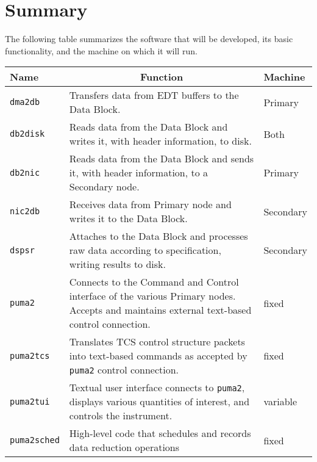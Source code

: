 \chapter{Summary}

The following table summarizes the software that will be developed,
its basic functionality, and the machine on which it will run.

\vspace{5mm}

\begin{tabular}{l|p{8cm}|l}

Name & \multicolumn{1}{c}{Function} & Machine \\ \hline

{\tt dma2db} & Transfers data from EDT buffers to the Data Block.
	& Primary \\

{\tt db2disk} & Reads data from the Data Block and writes it, with
	header information, to disk. & Both \\

{\tt db2nic} & Reads data from the Data Block and sends it, with
	header information, to a Secondary node. & Primary \\

{\tt nic2db} & Receives data from Primary node and writes it to the 
	Data Block. & Secondary \\

{\tt dspsr} & Attaches to the Data Block and processes raw data
	according to specification, writing results to disk. &
	Secondary \\

{\tt puma2} & Connects to the Command and Control interface of the
	various Primary nodes.  Accepts and maintains external
	text-based control connection.  & fixed \\

{\tt puma2tcs} & Translates TCS control structure packets into
	text-based commands as accepted by {\tt puma2} control
	connection. & fixed \\

{\tt puma2tui} & Textual user interface connects to {\tt puma2},
	displays various quantities of interest, and controls
	the instrument. & variable \\

{\tt puma2sched} & High-level code that schedules and records
        data reduction operations & fixed \\

\end{tabular}

